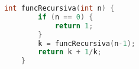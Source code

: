 \begin{lstlisting}[language=C++]
    int funcRecursiva(int n) {
        if (n == 0) {
            return 1;
        }
        k = funcRecursiva(n-1);
        return k + 1/k;
    }
\end{lstlisting}